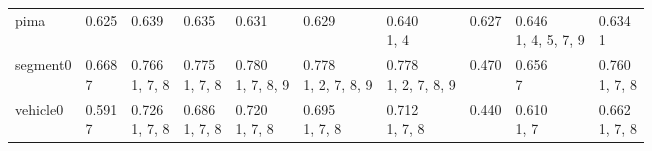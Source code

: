 \begin{tabular}{llllllllll}
pima                   &                  \makecell{0.625 \\ \scriptsize{}} &         \makecell{0.639 \\ \scriptsize{}} &         \makecell{0.635 \\ \scriptsize{}} &               \makecell{0.631 \\ \scriptsize{}} &               \makecell{0.629 \\ \scriptsize{}} &           \makecell{0.640 \\ \scriptsize{1, 4}} &                     \makecell{0.627 \\ \scriptsize{}} &  \makecell{0.646 \\ \scriptsize{1, 4, 5, 7, 9}} &        \makecell{0.634 \\ \scriptsize{1}} \\
segment0               &                 \makecell{0.668 \\ \scriptsize{7}} &  \makecell{0.766 \\ \scriptsize{1, 7, 8}} &  \makecell{0.775 \\ \scriptsize{1, 7, 8}} &     \makecell{0.780 \\ \scriptsize{1, 7, 8, 9}} &  \makecell{0.778 \\ \scriptsize{1, 2, 7, 8, 9}} &  \makecell{0.778 \\ \scriptsize{1, 2, 7, 8, 9}} &                     \makecell{0.470 \\ \scriptsize{}} &              \makecell{0.656 \\ \scriptsize{7}} &  \makecell{0.760 \\ \scriptsize{1, 7, 8}} \\
vehicle0               &                 \makecell{0.591 \\ \scriptsize{7}} &  \makecell{0.726 \\ \scriptsize{1, 7, 8}} &  \makecell{0.686 \\ \scriptsize{1, 7, 8}} &        \makecell{0.720 \\ \scriptsize{1, 7, 8}} &        \makecell{0.695 \\ \scriptsize{1, 7, 8}} &        \makecell{0.712 \\ \scriptsize{1, 7, 8}} &                     \makecell{0.440 \\ \scriptsize{}} &           \makecell{0.610 \\ \scriptsize{1, 7}} &  \makecell{0.662 \\ \scriptsize{1, 7, 8}} \\

\end{tabular}

